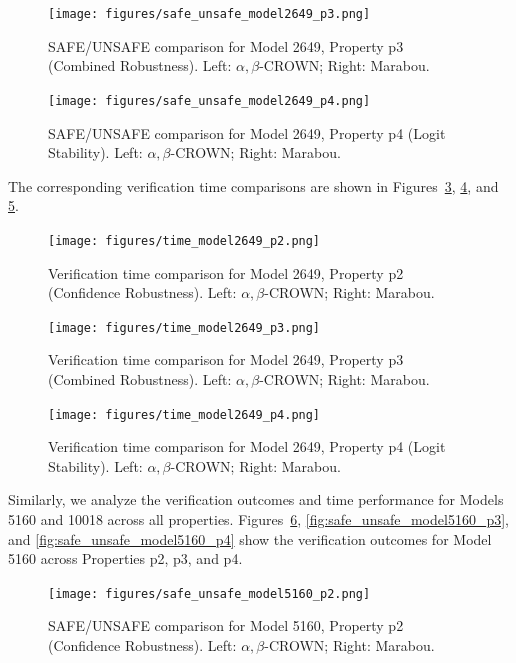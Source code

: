 \begin{figure}[htbp]
    \centering
    \texttt{[image: figures/safe\_unsafe\_model2649\_p3.png]}
    \caption{SAFE/UNSAFE comparison for Model 2649, Property p3 (Combined Robustness). Left: $\alpha, \beta$-CROWN; Right: Marabou.}
    \label{fig:safe_unsafe_model2649_p3}
\end{figure}

\begin{figure}[htbp]
    \centering
    \texttt{[image: figures/safe\_unsafe\_model2649\_p4.png]}
    \caption{SAFE/UNSAFE comparison for Model 2649, Property p4 (Logit Stability). Left: $\alpha, \beta$-CROWN; Right: Marabou.}
    \label{fig:safe_unsafe_model2649_p4}
\end{figure}

The corresponding verification time comparisons are shown in Figures~\ref{fig:time_model2649_p2}, \ref{fig:time_model2649_p3}, and \ref{fig:time_model2649_p4}.

\begin{figure}[htbp]
    \centering
    \texttt{[image: figures/time\_model2649\_p2.png]}
    \caption{Verification time comparison for Model 2649, Property p2 (Confidence Robustness). Left: $\alpha, \beta$-CROWN; Right: Marabou.}
    \label{fig:time_model2649_p2}
\end{figure}

\begin{figure}[htbp]
    \centering
    \texttt{[image: figures/time\_model2649\_p3.png]}
    \caption{Verification time comparison for Model 2649, Property p3 (Combined Robustness). Left: $\alpha, \beta$-CROWN; Right: Marabou.}
    \label{fig:time_model2649_p3}
\end{figure}

\begin{figure}[htbp]
    \centering
    \texttt{[image: figures/time\_model2649\_p4.png]}
    \caption{Verification time comparison for Model 2649, Property p4 (Logit Stability). Left: $\alpha, \beta$-CROWN; Right: Marabou.}
    \label{fig:time_model2649_p4}
\end{figure}

Similarly, we analyze the verification outcomes and time performance for Models 5160 and 10018 across all properties. Figures~\ref{fig:safe_unsafe_model5160_p2}, \ref{fig:safe_unsafe_model5160_p3}, and \ref{fig:safe_unsafe_model5160_p4} show the verification outcomes for Model 5160 across Properties p2, p3, and p4.

\begin{figure}[htbp]
    \centering
    \texttt{[image: figures/safe\_unsafe\_model5160\_p2.png]}
    \caption{SAFE/UNSAFE comparison for Model 5160, Property p2 (Confidence Robustness). Left: $\alpha, \beta$-CROWN; Right: Marabou.}
    \label{fig:safe_unsafe_model5160_p2}
\end{figure}

